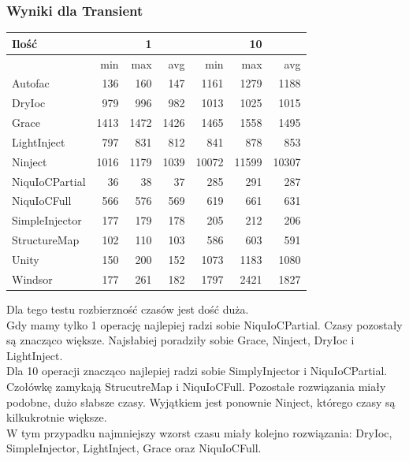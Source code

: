 \documentclass[12pt]{article}
\begin{document}
\subsubsection{Wyniki dla Transient}
\begin{center}
\begin{small}
	\begin{tabular}{ | l | r r r | r r r | }
    		\hline
Ilość & & 1 & & & 10 & \\ \hline
 & min & max & avg & min & max & avg \\ \hline
Autofac & 136 & 160 & 147 & 1161 & 1279 & 1188 \\ \hline
DryIoc & 979 & 996 & 982 & 1013 & 1025 & 1015 \\ \hline
Grace & 1413 & 1472 & 1426 & 1465 & 1558 & 1495 \\ \hline
LightInject & 797 & 831 & 812 & 841 & 878 & 853 \\ \hline
Ninject & 1016 & 1179 & 1039 & 10072 & 11599 & 10307 \\ \hline
NiquIoCPartial & 36 & 38 & 37 & 285 & 291 & 287 \\ \hline
NiquIoCFull & 566 & 576 & 569 & 619 & 661 & 631 \\ \hline
SimpleInjector & 177 & 179 & 178 & 205 & 212 & 206 \\ \hline
StructureMap & 102 & 110 & 103 & 586 & 603 & 591 \\ \hline
Unity & 150 & 200 & 152 & 1073 & 1183 & 1080 \\ \hline
Windsor & 177 & 261 & 182 & 1797 & 2421 & 1827 \\ \hline
  	\end{tabular}
\end{small}
\end{center}
Dla tego testu rozbierzność czasów jest dość duża.\\
Gdy mamy tylko 1 operację najlepiej radzi sobie NiquIoCPartial. Czasy pozostały są znacząco większe. Najsłabiej poradziły sobie Grace, Ninject, DryIoc i LightInject.\\
Dla 10 operacji znacząco najlepiej radzi sobie SimplyInjector i NiquIoCPartial. Czołówkę zamykają StrucutreMap i NiquIoCFull. Pozostałe rozwiązania miały podobne, dużo słabsze czasy. Wyjątkiem jest ponownie Ninject, którego czasy są kilkukrotnie większe.\\
W tym przypadku najmniejszy wzorst czasu miały kolejno rozwiązania: DryIoc, SimpleInjector, LightInject, Grace oraz NiquIoCFull.
\end{document}
